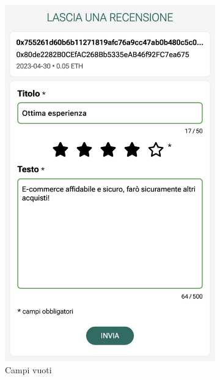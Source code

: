 \begin{figure}[H]
    \centering
    \begin{subfigure}[t]{0.49\textwidth}
    \centering
    \includegraphics[width=0.7\linewidth]{src/img/rilascio_recensione.jpeg}
    \caption{Campi vuoti}\label{fig:rilascio_recensione_vuoto}
    \end{subfigure}
    \centering
    \begin{subfigure}[t]{0.49\textwidth}
    \centering

\end{subfigure}
\end{figure}
